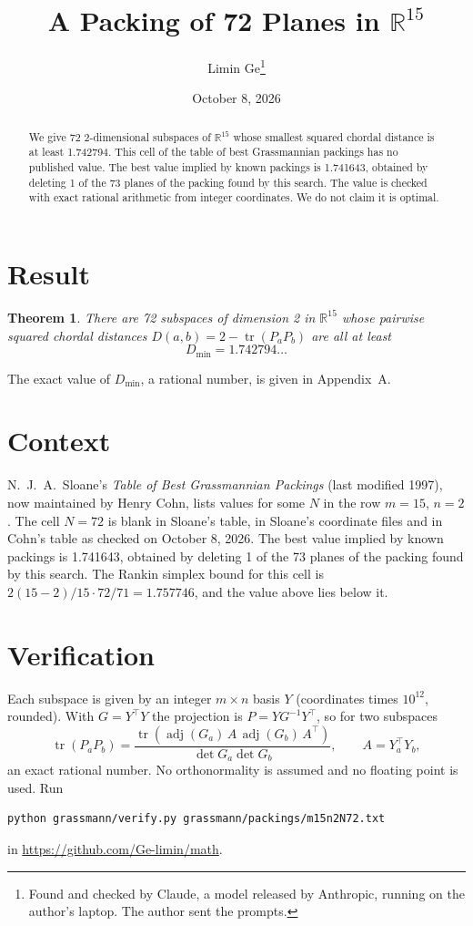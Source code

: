 \documentclass[11pt,a4paper]{article}
\title{A Packing of 72 Planes in $\mathbb{R}^{15}$}
\author{Limin Ge\thanks{Found and checked by Claude, a model released by Anthropic, running on the author's laptop. The author sent the prompts.}}
\date{October 8, 2026}
\newtheorem*{theorem}{Theorem}
\begin{document}
\maketitle
\begin{abstract}
We give 72 2-dimensional subspaces of $\mathbb{R}^{15}$ whose smallest squared chordal distance is at least 1.742794. This cell of the table of best Grassmannian packings has no published value. The best value implied by known packings is 1.741643, obtained by deleting 1 of the 73 planes of the packing found by this search. The value is checked with exact rational arithmetic from integer coordinates. We do not claim it is optimal.
\end{abstract}

\section{Result}
\begin{theorem}
There are 72 subspaces of dimension 2 in $\mathbb{R}^{15}$ whose pairwise squared chordal distances $D(a,b) = 2 - \operatorname{tr}(P_aP_b)$ are all at least
\[ D_{\min} = 1.742794\ldots \]
\end{theorem}
The exact value of $D_{\min}$, a rational number, is given in Appendix~A.


\section{Context}
N.~J.~A.~Sloane's \emph{Table of Best Grassmannian Packings} (last modified 1997), now maintained by Henry Cohn, lists values for some $N$ in the row $m=15$, $n=2$. The cell $N=72$ is blank in Sloane's table, in Sloane's coordinate files and in Cohn's table as checked on October 8, 2026. The best value implied by known packings is 1.741643, obtained by deleting 1 of the 73 planes of the packing found by this search. The Rankin simplex bound for this cell is $2(15-2)/15\cdot 72/71 = 1.757746$, and the value above lies below it.


\section{Verification}
Each subspace is given by an integer $m\times n$ basis $Y$ (coordinates times $10^{12}$, rounded). With $G=Y^\top Y$ the projection is $P=YG^{-1}Y^\top$, so for two subspaces
\[ \operatorname{tr}(P_aP_b)=\frac{\operatorname{tr}(\operatorname{adj}(G_a)\,A\,\operatorname{adj}(G_b)\,A^\top)}{\det G_a\det G_b},\qquad A=Y_a^\top Y_b, \]
an exact rational number. No orthonormality is assumed and no floating point is used. Run
\begin{verbatim}
python grassmann/verify.py grassmann/packings/m15n2N72.txt
\end{verbatim}
in \url{https://github.com/Ge-limin/math}.
\end{document}
